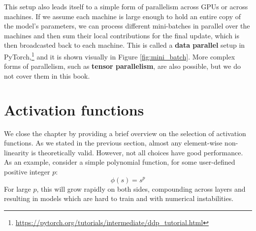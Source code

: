 This setup also leads itself to a simple form of parallelism across GPUs or across machines. If we assume each machine is large enough to hold an entire copy of the model's parameters, we can process different mini-batches in parallel over the machines and then sum their local contributions for the final update, which is then broadcasted back to each machine. This is called a \textbf{data parallel} setup in PyTorch,\footnote{\url{https://pytorch.org/tutorials/intermediate/ddp_tutorial.html}} and it is shown visually in Figure \ref{fig:mini_batch}. More complex forms of parallelism, such as \textbf{tensor parallelism}, are also possible, but we do not cover them in this book.


\section{Activation functions}
\label{sec:activation_functions}

We close the chapter by providing a brief overview on the selection of activation functions. As we stated in the previous section, almost any element-wise non-linearity is theoretically valid. However, not all choices have good performance. As an example, consider a simple polynomial function, for some user-defined positive integer $p$:
%
$$
\phi(s)=s^p
$$
%
For large $p$, this will grow rapidly on both sides, compounding across layers and resulting in models which are hard to train and with numerical instabilities. 

